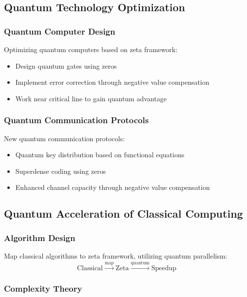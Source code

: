 \documentclass[11pt]{article}
\theoremstyle{plain}
\theoremstyle{definition}
\theoremstyle{remark}
\begin{document}
\subsection{Quantum Technology Optimization}

\subsubsection{Quantum Computer Design}

Optimizing quantum computers based on zeta framework:
\begin{itemize}
\item Design quantum gates using zeros
\item Implement error correction through negative value compensation
\item Work near critical line to gain quantum advantage
\end{itemize}

\subsubsection{Quantum Communication Protocols}

New quantum communication protocols:
\begin{itemize}
\item Quantum key distribution based on functional equations
\item Superdense coding using zeros
\item Enhanced channel capacity through negative value compensation
\end{itemize}

\subsection{Quantum Acceleration of Classical Computing}

\subsubsection{Algorithm Design}

Map classical algorithms to zeta framework, utilizing quantum parallelism:
$$\text{Classical} \xrightarrow{\text{map}} \text{Zeta} \xrightarrow{\text{quantum}} \text{Speedup}$$

\subsubsection{Complexity Theory}
\end{document}
